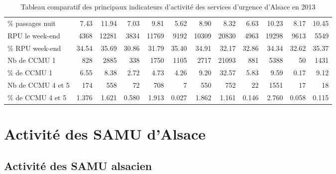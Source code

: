 \documentclass[12pt,english,french,twoside]{book}\usepackage[]{graphicx}\usepackage[]{color}
\begin{document}
\begin{landscape}
\begin{table}[ht]
\begin{tabular}{lrrrrrrrrrrr}
  \% passages nuit &  7.43 & 11.94 &  7.03 &  9.81 &  5.62 &  8.90 &  8.32 &  6.63 & 10.23 &  8.17 & 10.45 \\ 
  RPU le week-end &  4368 & 12281 &  3834 & 11769 &  9192 & 10309 & 20830 &  4963 & 19298 &  9613 &  5549 \\ 
  \% RPU week-end & 34.54 & 35.69 & 30.86 & 31.79 & 35.40 & 34.91 & 32.17 & 32.86 & 34.34 & 32.62 & 35.37 \\ 
  Nb de CCMU 1 &   828 &  2885 &   338 &  1750 &  1105 &  2717 & 21093 &   881 &  5388 &    50 &  1431 \\ 
  \% de CCMU 1 &  6.55 &  8.38 &  2.72 &  4.73 &  4.26 &  9.20 & 32.57 &  5.83 &  9.59 &  0.17 &  9.12 \\ 
  Nb de CCMU 4 et 5 &  174 &  558 &   72 &  708 &    7 &  550 &  752 &   22 & 1551 &   17 &   18 \\ 
  \% de CCMU 4 et 5 & 1.376 & 1.621 & 0.580 & 1.913 & 0.027 & 1.862 & 1.161 & 0.146 & 2.760 & 0.058 & 0.115 \\ 
   \hline
\end{tabular}
\caption[Tableu de synthèse des SU]{Tableau comparatif des principaux indicateurs d'activité des services d'urgence d'Alsace en 2013} 
\label{tab:synthèse}
\end{table}

\end{landscape}




\part{Activité des SAMU d'Alsace}






\chapter{Activité des SAMU alsacien}
\end{document}
